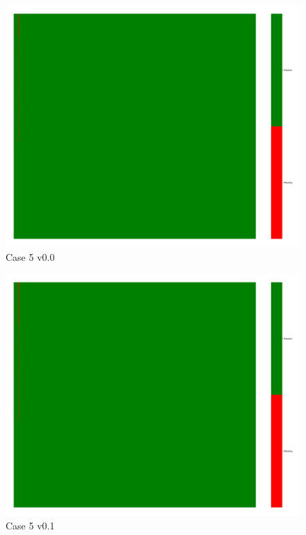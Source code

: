 \documentclass[a4paper,12pt]{article}
\begin{document}
\begin{figure}[H]
    \includegraphics[width=\linewidth]{case5_v0.0_heatmap_cleaned.png}
    \caption*{Case 5 v0.0}
\end{figure}

\begin{figure}[H]
    \includegraphics[width=\linewidth]{case5_v0.1_heatmap_cleaned.png}
    \caption*{Case 5 v0.1}
\end{figure}
\end{document}
